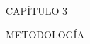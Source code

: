 \newpage
\thispagestyle{empty}
\vspace*{\fill}
\begingroup
\centering
\begin{flushright}{\fontsize{50}{60}\selectfont CAPÍTULO 3}\end{flushright}
\vspace{10 mm}
\begin{flushright}{\fontsize{30}{40}\selectfont METODOLOGÍA }\end{flushright}
\endgroup
\vspace*{\fill}
\newpage
